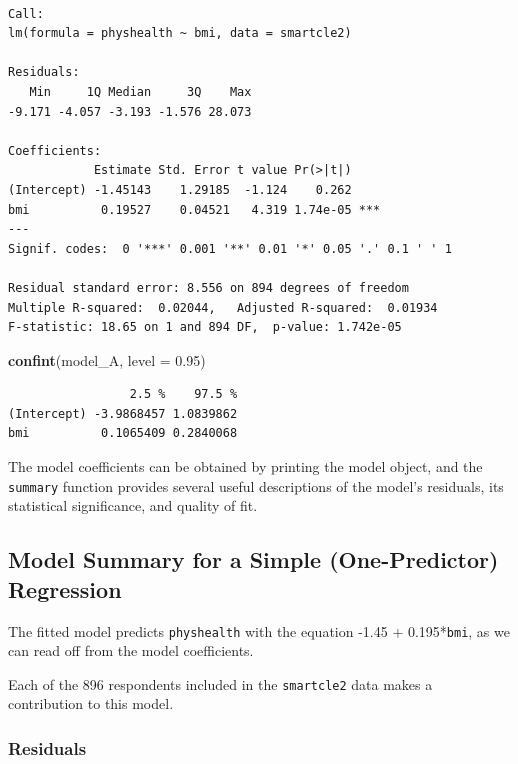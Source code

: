 \documentclass[]{book}
\newenvironment{Shaded}{\begin{snugshade}}{\end{snugshade}}
\newcommand{\KeywordTok}[1]{\textcolor[rgb]{0.13,0.29,0.53}{\textbf{#1}}}
\newcommand{\DataTypeTok}[1]{\textcolor[rgb]{0.13,0.29,0.53}{#1}}
\newcommand{\FloatTok}[1]{\textcolor[rgb]{0.00,0.00,0.81}{#1}}
\newcommand{\NormalTok}[1]{#1}
\theoremstyle{definition}
\theoremstyle{definition}
\theoremstyle{definition}
\theoremstyle{remark}
\begin{document}
\begin{verbatim}

Call:
lm(formula = physhealth ~ bmi, data = smartcle2)

Residuals:
   Min     1Q Median     3Q    Max 
-9.171 -4.057 -3.193 -1.576 28.073 

Coefficients:
            Estimate Std. Error t value Pr(>|t|)    
(Intercept) -1.45143    1.29185  -1.124    0.262    
bmi          0.19527    0.04521   4.319 1.74e-05 ***
---
Signif. codes:  0 '***' 0.001 '**' 0.01 '*' 0.05 '.' 0.1 ' ' 1

Residual standard error: 8.556 on 894 degrees of freedom
Multiple R-squared:  0.02044,   Adjusted R-squared:  0.01934 
F-statistic: 18.65 on 1 and 894 DF,  p-value: 1.742e-05
\end{verbatim}

\begin{Shaded}
\begin{Highlighting}[]
\KeywordTok{confint}\NormalTok{(model_A, }\DataTypeTok{level =} \FloatTok{0.95}\NormalTok{)}
\end{Highlighting}
\end{Shaded}

\begin{verbatim}
                 2.5 %    97.5 %
(Intercept) -3.9868457 1.0839862
bmi          0.1065409 0.2840068
\end{verbatim}

The model coefficients can be obtained by printing the model object, and
the \texttt{summary} function provides several useful descriptions of
the model's residuals, its statistical significance, and quality of fit.

\subsection{Model Summary for a Simple (One-Predictor)
Regression}\label{model-summary-for-a-simple-one-predictor-regression}

The fitted model predicts \texttt{physhealth} with the equation -1.45 +
0.195*\texttt{bmi}, as we can read off from the model coefficients.

Each of the 896 respondents included in the \texttt{smartcle2} data
makes a contribution to this model.

\subsubsection{Residuals}\label{residuals}
\end{document}
